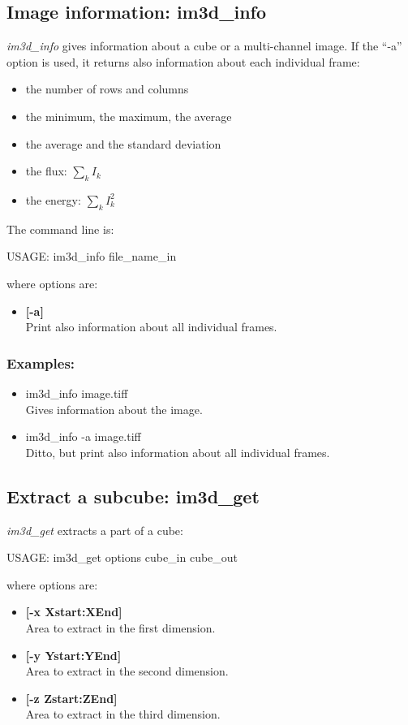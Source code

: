 \subsection{Image information: im3d\_info}
{\em im3d\_info} gives information about a cube or a multi-channel image.
If the ``-a'' option is used, 
it returns also information about each individual 
frame:
\begin{itemize}
\baselineskip=0.4truecm
\itemsep=0.1truecm
\item the number of rows and columns
\item the minimum, the maximum, the average
\item the average and the standard deviation
\item the flux: $\sum_k I_k$
\item the energy: $\sum_k I_k^2$
\end{itemize}
The command line is:
{\bf
\begin{center}
     USAGE: im3d\_info file\_name\_in 
\end{center}
}
where options are:
\begin{itemize}
\item {\bf[-a]} \\
Print also information about all individual frames.
\end{itemize}

\subsubsection*{Examples:}
\begin{itemize}
\baselineskip=0.4truecm
\itemsep=0.1truecm
\item im3d\_info image.tiff  \\
Gives information about the image.
\item im3d\_info -a image.tiff \\
Ditto, but print also information about all individual frames.
\end{itemize}

\subsection{Extract a subcube: im3d\_get}
{\em im3d\_get} extracts a part of a cube:
{\bf
\begin{center}
USAGE: im3d\_get options cube\_in cube\_out
\end{center}
}
where options are:
\begin{itemize}
\baselineskip=0.4truecm
\itemsep=0.1truecm
\item {\bf[-x Xstart:XEnd]} \\
Area to extract in the first dimension.
\item {\bf[-y Ystart:YEnd]} \\
Area to extract in the second dimension.
\item {\bf[-z Zstart:ZEnd]} \\
Area to extract in the third dimension.
\end{itemize}

